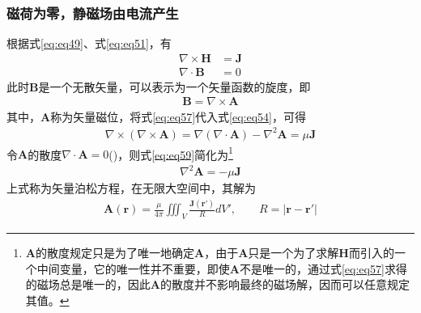 \documentclass{article}
\numberwithin{equation}{section}
\renewcommand{\vec}[1]{\boldsymbol{#1}}
\begin{document}
\subsubsection{磁荷为零，静磁场由电流产生}
根据式\ref{eq:eq49}、式\ref{eq:eq51}，有
\begin{align}
    \label{eq:eq54}
    \nabla \times \mathbf{H}&=\mathbf{J} \\
    \label{eq:eq55}
    \nabla \cdot \mathbf{B}&=0
\end{align}
此时$\mathbf{B}$是一个无散矢量，可以表示为一个矢量函数的旋度，即
\begin{align}
    \label{eq:eq57}
    \mathbf{B}=\nabla \times \mathbf{A}
\end{align}
其中，$\mathbf{A}$称为矢量磁位，将式\ref{eq:eq57}代入式\ref{eq:eq54}，可得
\begin{align}
    \label{eq:eq59}
    \nabla \times (\nabla \times \mathbf{A})=\nabla(\nabla \cdot \mathbf{A})-\nabla^2\mathbf{A}=\mu \mathbf{J}
\end{align}
令$\mathbf{A}$的散度$\nabla \cdot \mathbf{A}=0$(\textbf{\color{blue}{库仑规范}})，则式\ref{eq:eq59}简化为\footnote{$\mathbf{A}$的散度规定只是为了唯一地确定$\mathbf{A}$，由于$\mathbf{A}$只是一个为了求解$\mathbf{H}$而引入的一个中间变量，它的唯一性并不重要，即使$\mathbf{A}$不是唯一的，通过式\ref{eq:eq57}求得的磁场总是唯一的，因此$\mathbf{A}$的散度并不影响最终的磁场解，因而可以任意规定其值。}
\begin{align}
    \label{eq:eq61}
    \nabla^2\mathbf{A}=-\mu \mathbf{J}
\end{align}
上式称为矢量泊松方程，在无限大空间中，其解为
\begin{align}
    \label{eq:eq62}
    \mathbf{A}(\vec{r})=\frac{\mu}{4\pi}\iiint_V\frac{\mathbf{J}(\vec{r}')}{R}dV',\qquad R=|\vec{r}-\vec{r}'|
\end{align}
\end{document}
